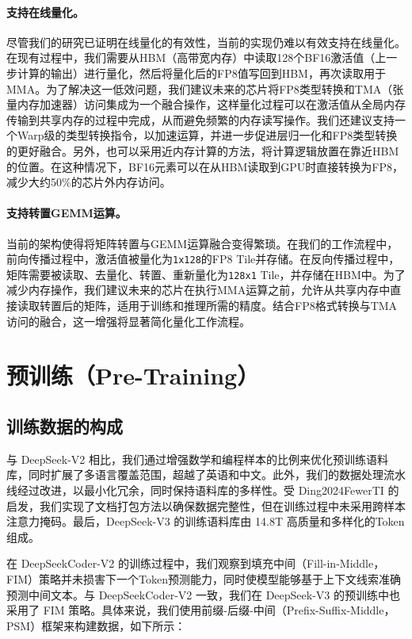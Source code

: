 \documentclass[lang=cn,a4paper,newtx]{elegantpaper}
\newcommand{\dsvii}{DeepSeek-V2}
\newcommand{\dsviii}{DeepSeek-V3}
\begin{document}
\paragraph{支持在线量化。}
尽管我们的研究已证明在线量化的有效性，当前的实现仍难以有效支持在线量化。在现有过程中，我们需要从HBM（高带宽内存）中读取128个BF16激活值（上一步计算的输出）进行量化，然后将量化后的FP8值写回到HBM，再次读取用于MMA。为了解决这一低效问题，我们建议未来的芯片将FP8类型转换和TMA（张量内存加速器）访问集成为一个融合操作，这样量化过程可以在激活值从全局内存传输到共享内存的过程中完成，从而避免频繁的内存读写操作。我们还建议支持一个Warp级的类型转换指令，以加速运算，并进一步促进层归一化和FP8类型转换的更好融合。另外，也可以采用近内存计算的方法，将计算逻辑放置在靠近HBM的位置。在这种情况下，BF16元素可以在从HBM读取到GPU时直接转换为FP8，减少大约50\%的芯片外内存访问。

\paragraph{支持转置GEMM运算。}
当前的架构使得将矩阵转置与GEMM运算融合变得繁琐。在我们的工作流程中，前向传播过程中，激活值被量化为\texttt{1x128}的FP8 Tile并存储。在反向传播过程中，矩阵需要被读取、去量化、转置、重新量化为\texttt{128x1} Tile，并存储在HBM中。为了减少内存操作，我们建议未来的芯片在执行MMA运算之前，允许从共享内存中直接读取转置后的矩阵，适用于训练和推理所需的精度。结合FP8格式转换与TMA访问的融合，这一增强将显著简化量化工作流程。

\section{预训练（Pre-Training）}
\label{sec:pre-training}

\subsection{训练数据的构成}

与 \dsvii{} 相比，我们通过增强数学和编程样本的比例来优化预训练语料库，同时扩展了多语言覆盖范围，超越了英语和中文。此外，我们的数据处理流水线经过改进，以最小化冗余，同时保持语料库的多样性。受 Ding2024FewerTI 的启发，我们实现了文档打包方法以确保数据完整性，但在训练过程中未采用跨样本注意力掩码。最后，\dsviii{} 的训练语料库由 14.8T 高质量和多样化的Token组成。

在 DeepSeekCoder-V2 的训练过程中，我们观察到填充中间（Fill-in-Middle，FIM）策略并未损害下一个Token预测能力，同时使模型能够基于上下文线索准确预测中间文本。与 DeepSeekCoder-V2 一致，我们在 \dsviii{} 的预训练中也采用了 FIM 策略。具体来说，我们使用前缀-后缀-中间（Prefix-Suffix-Middle，PSM）框架来构建数据，如下所示：
\end{document}

